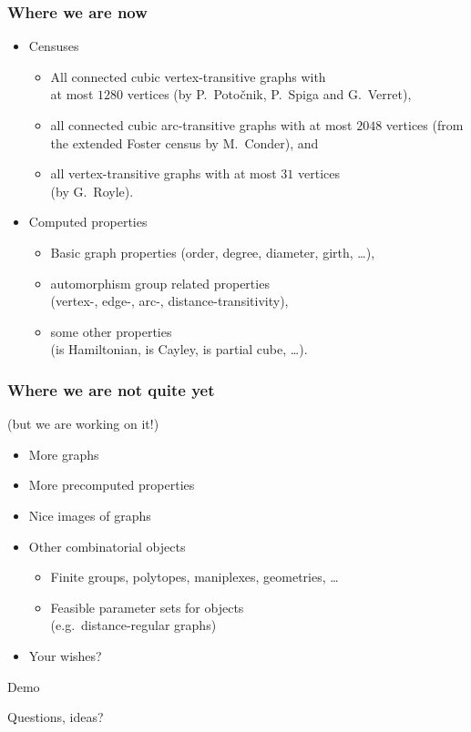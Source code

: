 \documentclass[usepdftitle=false]{beamer}
\newcommand{\defn}[1]{\textcolor{zoored}{\emph{#1}}}
\newcommand{\keyw}[1]{\textcolor{zooteal}{#1}}
\newcommand{\con}[1]{\textcolor{zoored}{#1}}
\begin{document}
\frame
{
    \frametitle{Where we are now}

    \begin{itemize}
    \itemsep=5mm
    \item \con{Censuses}
        \begin{itemize}
        \itemsep=3mm
        \item All connected \keyw{cubic vertex-transitive} graphs with \\
        at most \defn{$1280$} vertices (by P.~Potočnik, P.~Spiga and G.~Verret),
        \item all connected \keyw{cubic arc-transitive} graphs with at most
        \defn{$2048$} vertices (from the extended Foster census by M.~Conder),
        and
        \item all \keyw{vertex-transitive graphs} with at most \defn{$31$}
        vertices \\ (by G.~Royle).
        \end{itemize}
    \item \con{Computed properties}
        \begin{itemize}
        \itemsep=3mm
        \item Basic graph properties (\keyw{order}, \keyw{degree},
        \keyw{diameter}, \keyw{girth}, \dots),
        \item automorphism group related properties \\
        (\keyw{vertex-}, \keyw{edge-}, \keyw{arc-},
        \keyw{distance-transitivity}),
        \item some other properties \\
        (\keyw{is Hamiltonian}, \keyw{is Cayley}, \keyw{is partial cube},
        \dots).
        \end{itemize}
    \end{itemize}
}

\frame
{
    \frametitle{Where we are not quite yet}
    (but we are working on it!)
    \vskip 1cm

    \begin{itemize}
    \itemsep=5mm
    \item More graphs
    \item More precomputed properties
    \item Nice \keyw{images} of graphs
    \item Other combinatorial objects
        \begin{itemize}
        \itemsep=3mm
        \item \keyw{Finite groups}, \keyw{polytopes}, \keyw{maniplexes},
        \keyw{geometries}, \dots
        \item Feasible \keyw{parameter sets} for objects \\
        (e.g.~distance-regular graphs)
        \end{itemize}
    \item \con{Your wishes?}
    \end{itemize}
    \vskip 1cm
}

\frame
{
\begin{center}
\huge
\con{Demo}
\end{center}
}


\frame
{
\begin{center}
\huge
\con{Questions, ideas?}
\end{center}
}
\end{document}
